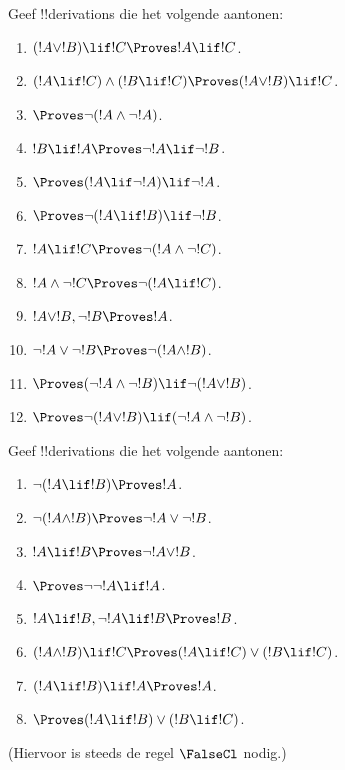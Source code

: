 \documentclass[../../../include/open-logic-section]{subfiles}
\begin{document}
\begin{prob}
Geef !!{derivation}s die het volgende aantonen:
\begin{enumerate}
\item $(!A \lor !B) \lif !C \Proves !A \lif !C$.
\item $(!A \lif !C) \land (!B \lif !C) \Proves (!A \lor !B) \lif !C$.
\item $\Proves \lnot(!A \land \lnot !A)$.
\item $!B \lif !A \Proves \lnot !A \lif \lnot !B$.
\item $\Proves (!A \lif \lnot !A) \lif \lnot !A$.
\item $\Proves \lnot(!A \lif !B) \lif \lnot !B$.
\item $!A \lif !C \Proves \lnot (!A \land \lnot !C)$.
\item $!A \land \lnot !C \Proves \lnot (!A \lif !C)$.
\item $!A \lor !B, \lnot !B \Proves !A$.
\item $\lnot !A \lor \lnot !B \Proves \lnot(!A \land !B)$.
\item $\Proves (\lnot !A \land \lnot !B) \lif\lnot(!A \lor !B)$.
\item $\Proves \lnot(!A \lor !B) \lif (\lnot !A \land \lnot !B)$.
\end{enumerate}
\end{prob}

\begin{prob}
Geef !!{derivation}s die het volgende aantonen:
\begin{enumerate}
\item $\lnot(!A \lif !B) \Proves !A$.
\item $\lnot(!A \land !B) \Proves \lnot !A \lor \lnot !B$.
\item $!A \lif !B \Proves \lnot !A \lor !B$.
\item $\Proves \lnot \lnot !A \lif !A$.
\item $!A \lif !B, \lnot !A \lif !B \Proves !B$.
\item $(!A \land !B) \lif !C \Proves (!A \lif !C) \lor (!B \lif !C)$.
\item $(!A \lif !B) \lif !A \Proves !A$.
\item $\Proves (!A \lif !B) \lor (!B \lif !C)$.
\end{enumerate}
(Hiervoor is steeds de regel $\FalseCl$ nodig.)
\end{prob}
\end{document}
